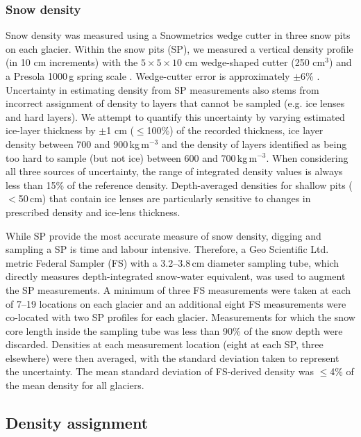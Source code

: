 \documentclass[review,oneside, letterpaper]{igs}
\begin{document}
\subsubsection{Snow density}

Snow density was measured using a Snowmetrics wedge cutter in three snow pits on each glacier. Within the snow pits (SP), we measured a vertical density profile (in 10 cm increments) with the $5\times5\times 10$ cm wedge-shaped cutter (250 cm$^3$) and a Presola 1000\,g spring scale \citep[e.g.][]{Gray1981,Fierz2009,Kinar2015}. Wedge-cutter error is approximately $\pm$6\% \citep[e.g.][]{Proksch2016,Carroll1977}. Uncertainty in estimating density from SP measurements also stems from incorrect assignment of density to layers that cannot be sampled (e.g. ice lenses and hard layers). We attempt to quantify this uncertainty by varying estimated ice-layer thickness by $\pm$1 cm ($\leq$100\%) of the recorded thickness, ice layer density between 700 and 900\,kg\,m$^{-3}$ and the density of layers identified as being too hard to sample (but not ice) between 600 and 700\,kg\,m$^{-3}$. When considering all three sources of uncertainty, the range of integrated density values is always less than 15\% of the reference density. Depth-averaged densities for shallow pits ($<$50\,cm) that contain ice lenses are particularly sensitive to changes in prescribed density and ice-lens thickness. 

While SP provide the most accurate measure of snow density, digging and sampling a SP is time and labour intensive. Therefore, a Geo Scientific Ltd. metric Federal Sampler (FS) \citep{Clyde1932} with a 3.2--3.8\,cm diameter sampling tube, which directly measures depth-integrated snow-water equivalent, was used to augment the SP measurements. A minimum of three FS measurements were taken at each of 7--19 locations on each glacier and an additional eight FS measurements were co-located with two SP profiles for each glacier. Measurements for which the snow core length inside the sampling tube was less than 90\% of the snow depth were discarded. Densities at each measurement location (eight at each SP, three elsewhere) were then averaged, with the standard deviation taken to represent the uncertainty. The mean standard deviation of FS-derived density was $\leq$4\% of the mean density for all glaciers.

\subsection{Density assignment}
\end{document}
